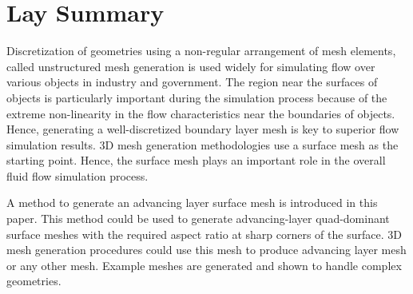 

\chapter{Lay Summary}

Discretization of geometries using a non-regular arrangement of mesh elements, called unstructured mesh generation is used widely for simulating flow over various objects in industry and government. The region near the surfaces of objects is particularly important during the simulation process because of the extreme non-linearity in the flow characteristics near the boundaries of objects. Hence, generating a well-discretized boundary layer mesh is key to superior flow simulation results. 3D mesh generation methodologies use a surface mesh as the starting point. Hence, the surface mesh plays an important role in the overall fluid flow simulation process.

A method to generate an advancing layer surface mesh is introduced in this paper. This method could be used to generate advancing-layer quad-dominant surface meshes with the required aspect ratio at sharp corners of the surface. 3D mesh generation procedures could use this mesh to produce advancing layer mesh or any other mesh. Example meshes are generated and shown to handle complex geometries.

